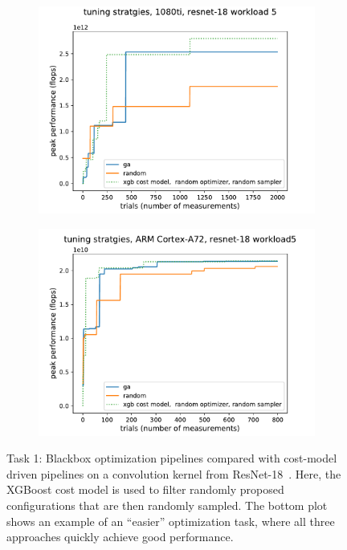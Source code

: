 \begin{figure}[tb]
\begin{center}
\begin{subfigure}[]{\textwidth}
\includegraphics[width=\textwidth]{sys_figures/blackbox1080tiresnet-18_5_.pdf}
\end{subfigure}
\end{center}
\begin{center}
\begin{subfigure}[]{\textwidth}
\includegraphics[width=\textwidth]{sys_figures/blackboxrk3399_resnet-18_5_.pdf}
\end{subfigure}
\end{center}
\caption{Task 1: Blackbox optimization pipelines compared with cost-model driven pipelines on a convolution kernel from ResNet-18~\cite{He_2016_CVPR}. Here, the XGBoost cost model is used to filter randomly proposed configurations that are then randomly sampled. The bottom plot shows an example of an ``easier'' optimization task, where all three approaches quickly achieve good performance.}
\label{fig:blackbox}
\end{figure}

